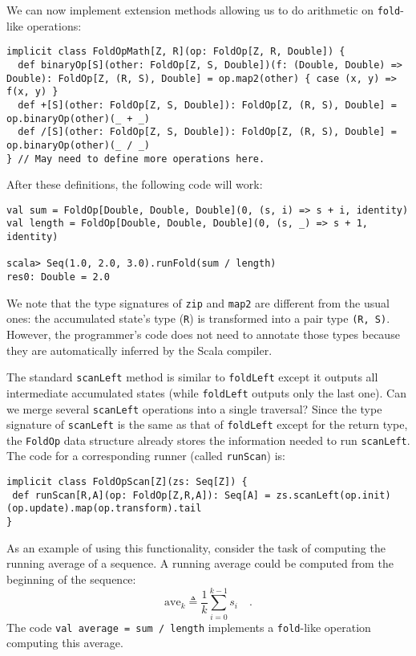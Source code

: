 We can now implement extension methods allowing us to do arithmetic
on \lstinline!fold!-like operations:
\begin{lstlisting}
implicit class FoldOpMath[Z, R](op: FoldOp[Z, R, Double]) {
  def binaryOp[S](other: FoldOp[Z, S, Double])(f: (Double, Double) => Double): FoldOp[Z, (R, S), Double] = op.map2(other) { case (x, y) => f(x, y) }
  def +[S](other: FoldOp[Z, S, Double]): FoldOp[Z, (R, S), Double] = op.binaryOp(other)(_ + _) 
  def /[S](other: FoldOp[Z, S, Double]): FoldOp[Z, (R, S), Double] = op.binaryOp(other)(_ / _) 
} // May need to define more operations here.
\end{lstlisting}

After these definitions, the following code will work:
\begin{lstlisting}
val sum = FoldOp[Double, Double, Double](0, (s, i) => s + i, identity)
val length = FoldOp[Double, Double, Double](0, (s, _) => s + 1, identity)

scala> Seq(1.0, 2.0, 3.0).runFold(sum / length)
res0: Double = 2.0
\end{lstlisting}

We note that the type signatures of \lstinline!zip! and \lstinline!map2!
are different from the usual ones: the accumulated state\textsf{'}s type (\lstinline!R!)
is transformed into a pair type \lstinline!(R, S)!. However, the
programmer\textsf{'}s code does not need to annotate those types because they
are automatically inferred by the Scala compiler.

The standard \lstinline!scanLeft! method is similar to \lstinline!foldLeft!
except it outputs all intermediate accumulated states (while \lstinline!foldLeft!
outputs only the last one). Can we merge several \lstinline!scanLeft!
operations into a single traversal? Since the type signature of \lstinline!scanLeft!
is the same as that of \lstinline!foldLeft! except for the return
type, the \lstinline!FoldOp! data structure already stores the information
needed to run \lstinline!scanLeft!. The code for a corresponding
runner (called \lstinline!runScan!) is:
\begin{lstlisting}
implicit class FoldOpScan[Z](zs: Seq[Z]) {
 def runScan[R,A](op: FoldOp[Z,R,A]): Seq[A] = zs.scanLeft(op.init)(op.update).map(op.transform).tail
}
\end{lstlisting}

As an example of using this functionality, consider the task of computing
the running average of a sequence. A running average could be computed
from the beginning of the sequence:
\[
\text{ave}_{k}\triangleq\frac{1}{k}\sum_{i=0}^{k-1}s_{i}\quad.
\]
The code \lstinline!val average = sum / length! implements a \lstinline!fold!-like
operation computing this average.

